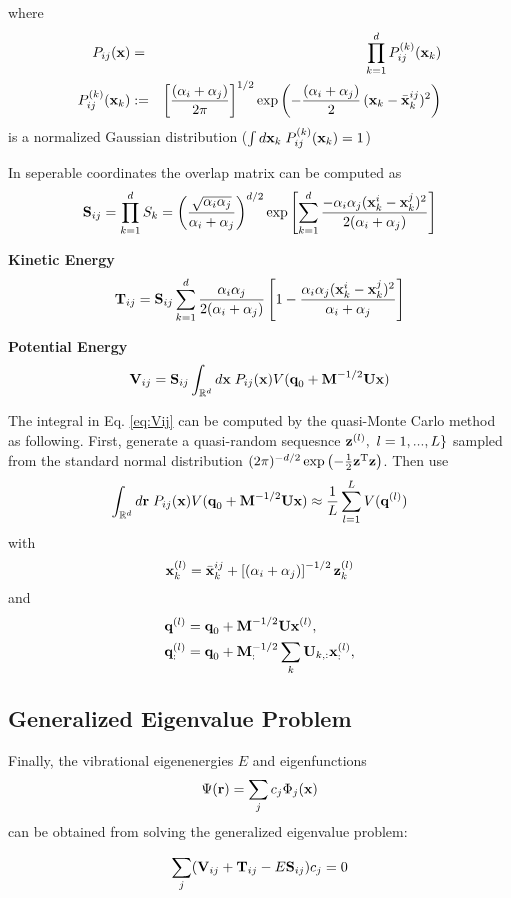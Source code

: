 \documentclass[preprint,showpacs,preprintnumbers,amsmath,amssymb]{revtex4}
\newcommand{\be}{\begin{equation}}
\newcommand{\ee}{\end{equation}}
\newcommand{\bea}{\begin{eqnarray}}
\newcommand{\eea}{\end{eqnarray}}
\newcommand{\bbx}{\bar{\mbox{\bf x}}^{ij}}
\newcommand{\bx}{\mbox{\bf x}}        %
\newcommand{\bU}{\mbox{\bf U}}
\newcommand{\bV}{\mbox{\bf V}}
\newcommand{\Eq}{Eq. \ref}
\newcommand{\br}{\mbox{\bf r}}
\newcommand{\bz}{\mbox{\bf z}}
\newcommand{\bq}{\mbox{\bf q}}
\newcommand{\bS}{\mbox{\bf S}}
\newcommand{\bM}{\mbox{\bf M}}
\newcommand{\bT}{\mbox{\bf T}}
\begin{document}
where
\bea
P_{ij}(\bx) &=& \prod_{k=1}^d P_{ij}^{(k)}(\bx_k)\\\nonumber
P_{ij}^{(k)}(\bx_k) &:=& \left[\frac{(\alpha_i+\alpha_j)}{2\pi}\right]^{1/2}
 \exp\left(-\frac {(\alpha_i+\alpha_j)}{2}\,
   (\bx_k-\bbx_k)^2\right) 
\eea
is a normalized Gaussian distribution ($\int d\bx_k\; P_{ij}^{(k)}(\bx_k)=1$)

In seperable coordinates the overlap matrix can be computed as
\be
    \bS_{ij} = \prod_{k=1}^d S_k = \left(\frac{\sqrt{\alpha_i\alpha_j}}{\alpha_i+\alpha_j}\right)^{d/2} \exp\left[\sum_{k=1}^d \frac{-\alpha_i\alpha_j(\bx_k^i-\bx_k^j)^2}{2(\alpha_i+\alpha_j)}\right]
\ee

\textbf{Kinetic Energy} 
\be
\bT_{ij}=\bS_{ij}\sum_{k=1}^d \frac{\alpha_i\alpha_j}{2(\alpha_i+\alpha_j)}\left[1-
\frac{\alpha_i\alpha_j(\bx^i_k-\bx^j_k)^2}{\alpha_i+\alpha_j}\right]
\ee

\textbf{Potential Energy}
\be\label{eq:Vij}
\bV_{ij} = \bS_{ij} \int_{\mathbb{R}^d}d\bx\; P_{ij}(\bx) V(\bq_0+\bM^{-1/2}\bU\bx) 
\ee

The integral in \Eq{eq:Vij} can be computed by the quasi-Monte Carlo
method as following.
First, generate a quasi-random sequesnce $\bz^{(l)},\ l=1,...,L\}$
sampled from the standard normal distribution $(2\pi)^{-d/2} \exp\left(-\frac 1 2
  \bz^{\rm T} \bz \right)$. Then use
\be
\int_{\mathbb{R}^d}d\br\; P_{ij}(\bx) V(\bq_0+\bM^{-1/2}\bU\bx) \approx \frac 1 L
\sum_{l=1}^L V(\bq^{(l)})
\ee 
with
\be
\bx_k^{(l)}=\bbx_k+\left[(\alpha_i+\alpha_j)\right]^{-1/2}\bz_k^{(l)}
\ee
and
\be
\begin{split}
    \bq^{(l)}&=\bq_0+\bM^{-1/2}\bU\bx^{(l)},\\
    \bq_:^{(l)}&=\bq_0+\bM_:^{-1/2}\sum_k \bU_{k,:}\bx_:^{(l)},\\
\end{split}
\ee

\subsection*{Generalized Eigenvalue Problem}
Finally, the vibrational eigenenergies $E$ and eigenfunctions 
\be
\Psi(\br)=\sum_j c_j\Phi_j(\bx)
\ee
can be obtained from solving the generalized eigenvalue problem:

\be\label{eq:GEP}
\sum_j(\bV_{ij}+\bT_{ij}-E\bS_{ij})c_j=0
\ee
\end{document}

